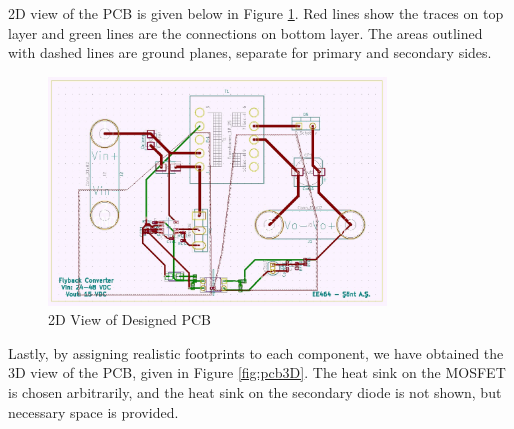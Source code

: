 2D view of the PCB is given below in Figure \ref{fig:pcb2D}. Red lines show the traces on top layer and green lines are the connections on bottom layer. The areas outlined with dashed lines are ground planes, separate for primary and secondary sides.

\begin{figure}[H]
\begin{center}
\includegraphics[width=0.8\textwidth]{figures/pcb2d.jpg}
\caption{2D View of Designed PCB}
\label{fig:pcb2D}
\end{center}
\end{figure}

Lastly, by assigning realistic footprints to each component, we have obtained the 3D view of the PCB, given in Figure \ref{fig:pcb3D}. The heat sink on the MOSFET is chosen arbitrarily, and the heat sink on the secondary diode is not shown, but necessary space is provided.

